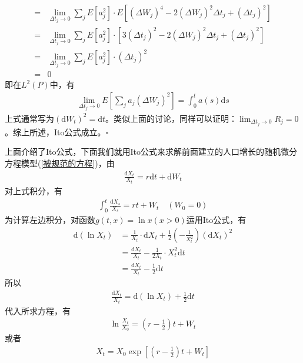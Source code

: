 \begin{Proof}
\begin{align*}
                    ={}&\lim_{\Delta t_j \rightarrow 0} \sum_jE[a_j^2]\cdot E[(\Delta W_j)^4 - 2(\Delta W_j)^2 \Delta t_j + (\Delta t_j)^2]\\
                    ={}&\lim_{\Delta t_j \rightarrow 0} \sum_jE[a_j^2]\cdot [3(\Delta t_j)^2 - 2(\Delta W_j)^2 \Delta t_j + (\Delta t_j)^2]\\
                    ={}&\lim_{\Delta t_j \rightarrow 0} \sum_jE[a_j^2]\cdot (\Delta t_j)^2\\
                    ={}& 0
                \end{align*}
                即在$L^2(P)$中，有
                \begin{align*}
                    \lim_{\Delta t_j \rightarrow 0} E\left[ \sum_j a_j (\Delta W_j)^2 \right] = \int_0^ta(s)\mathrm{d}s
                \end{align*}
                上式通常写为$(\mathrm{d}W_t)^2 = \mathrm{d}t$。类似上面的讨论，同样可以证明：$\lim_{\Delta t_j \rightarrow 0} R_j = 0$。综上所述，Ito公式成立。$\square$
            \end{Proof}
            \par
            上面介绍了Ito公式，下面我们就用Ito公式来求解前面建立的人口增长的随机微分方程模型(\ref{被规范的方程})，由
            \begin{align*}
                \frac{\mathrm{d}X_t }{X_t} = r\mathrm{d}t + \mathrm{d}W_t
            \end{align*}
            对上式积分，有
            \begin{align*}
                \int_0^t \frac{\mathrm{d}X_s}{X_s} = rt+W_t \quad (W_0 = 0)
            \end{align*}
            为计算左边积分，对函数$g(t,x) = \ln x(x>0)$运用Ito公式，有
            \begin{align*}
                \mathrm{d}(\ln X_t) &= \frac{1}{X_t} \cdot \mathrm{d}X_t + \frac 12\left(- \frac{1}{X_t^2} \right) (\mathrm{d}X_t)^2\\
                &=\frac{\mathrm{d}X_t}{X_t} - \frac{1}{2X_t} \cdot X_t^2 \mathrm{d}t \\
                & = \frac{\mathrm{d}X_t}{X_t} -\frac{1}{2} \mathrm{d}t
            \end{align*}
            所以
            \begin{align*}
                \frac{\mathrm{d}X_t }{X_t} = \mathrm{d}(\ln X_t) + \frac 12 \mathrm{d}t
            \end{align*}
            代入所求方程，有
            \begin{align*}
                \ln \frac{X_t}{X_0} = \left( r - \frac 12 \right)t + W_t
            \end{align*}
            或者
            \begin{align*}
                X_t = X_0 \exp \left[\left( r - \frac 12 \right)t + W_t\right]
            \end{align*}

